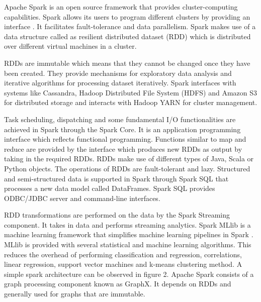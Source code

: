 \documentclass[9pt,twocolumn,twoside]{../../styles/osajnl}
\begin{document}
Apache Spark is an open source framework that provides
cluster-computing capabilities. Spark allows its users to program
different clusters by providing an interface \cite{sparkWiki}. It
facilitates fault-tolerance and data parallelism. Spark makes use of a
data structure called as resilient distributed dataset (RDD) which is
distributed over different virtual machines in a cluster.

RDDs are immutable which means that they cannot be changed once they
have been created. They provide mechanisms for exploratory data
analysis and iterative algorithms for processing dataset
iteratively. Spark interfaces with systems like Cassandra, Hadoop
Distributed File System (HDFS) and Amazon S3 for distributed storage
and interacts with Hadoop YARN for cluster management.

Task scheduling, dispatching and some fundamental I/O functionalities
are achieved in Spark through the Spark Core. It is an application
programming interface which reflects functional programming. Functions
similar to map and reduce are provided by the interface which produces
new RDDs as output by taking in the required RDDs. RDDs make use of
different types of Java, Scala or Python objects. The operations of
RDDs are fault-tolerant and lazy. Structured and semi-structured data
is supported in Spark through Spark SQL that processes a new data
model called DataFrames. Spark SQL provides ODBC/JDBC server and
command-line interfaces.

RDD transformations are performed on the data by the Spark Streaming
component. It takes in data and performs streaming analytics. Spark
MLlib is a machine learning framework that simplifies machine learning
pipelines in Spark \cite{sparkWiki}. MLlib is provided with several
statistical and machine learning algorithms. This reduces the overhead
of performing classification and regression, correlations, linear
regression, support vector machines and k-means clustering method. A
simple spark architecture can be observed in figure 2. Apache Spark
consists of a graph processing component known as GraphX. It depends
on RDDs and generally used for graphs that are immutable.
\end{document}
